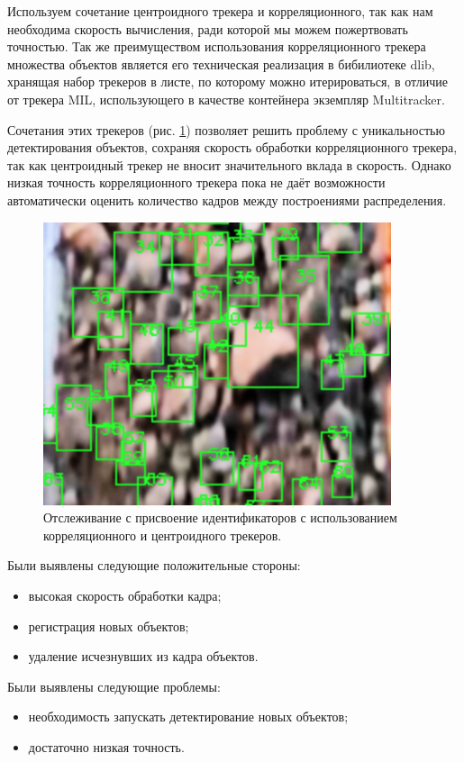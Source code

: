 \documentclass[times]{itmo-student-thesis}
\begin{document}
Используем сочетание центроидного трекера и корреляционного, так как нам необходима скорость вычисления, ради которой мы можем пожертвовать точностью. Так же преимуществом использования корреляционного трекера множества объектов является его техническая реализация в бибилиотеке dlib, хранящая набор трекеров в листе, по которому можно итерироваться, в отличие от трекера MIL, использующего в качестве контейнера экземпляр Multitracker.

Сочетания этих трекеров (рис. \ref{fig:centroidids})  позволяет решить проблему с уникальностью детектирования объектов, сохраняя скорость обработки корреляционного трекера, так как центроидный трекер не вносит значительного вклада в скорость. Однако низкая точность корреляционного трекера пока не даёт возможности автоматически оценить количество кадров между построениями распределения. 

\begin{figure}
	\centering
	\includegraphics[width=0.6\linewidth]{images/centroid_ids}
	\caption{Отслеживание с присвоение идентификаторов с использованием корреляционного и центроидного трекеров.}
	\label{fig:centroidids}
\end{figure}

Были выявлены следующие положительные стороны:
\begin{itemize}
	\item высокая скорость обработки кадра;
	\item регистрация новых объектов;
	\item удаление исчезнувших из кадра объектов.
\end{itemize}

Были выявлены следующие проблемы:
\begin{itemize}
	\item необходимость запускать детектирование новых объектов;
	\item достаточно низкая точность.
\end{itemize}
\end{document}

